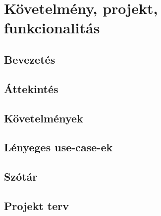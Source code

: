 %
\chapter{Követelmény, projekt, funkcionalitás}

\thispagestyle{fancy}

\section{Bevezetés}










\section{Áttekintés}


\section{Követelmények}


\section{Lényeges use-case-ek}


\section{Szótár}


\section{Projekt terv}



